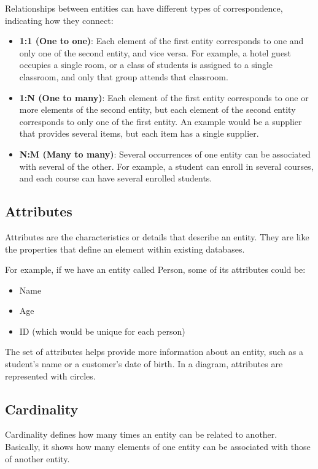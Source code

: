 \documentclass{article}
\begin{document}
Relationships between entities can have different types of correspondence, indicating how they connect:

\begin{itemize}
    \item \textbf{1:1 (One to one)}: Each element of the first entity corresponds to one and only one of the second entity, and vice versa. For example, a hotel guest occupies a single room, or a class of students is assigned to a single classroom, and only that group attends that classroom.
    \item \textbf{1:N (One to many)}: Each element of the first entity corresponds to one or more elements of the second entity, but each element of the second entity corresponds to only one of the first entity. An example would be a supplier that provides several items, but each item has a single supplier.
    \item \textbf{N:M (Many to many)}: Several occurrences of one entity can be associated with several of the other. For example, a student can enroll in several courses, and each course can have several enrolled students.
\end{itemize}

\subsection{Attributes}

Attributes are the characteristics or details that describe an entity. They are like the properties that define an element within existing databases.

For example, if we have an entity called Person, some of its attributes could be:

\begin{itemize}
    \item Name
    \item Age
    \item ID (which would be unique for each person)
\end{itemize}

The set of attributes helps provide more information about an entity, such as a student's name or a customer's date of birth. In a diagram, attributes are represented with circles.

\subsection{Cardinality}

Cardinality defines how many times an entity can be related to another. Basically, it shows how many elements of one entity can be associated with those of another entity.
\end{document}
